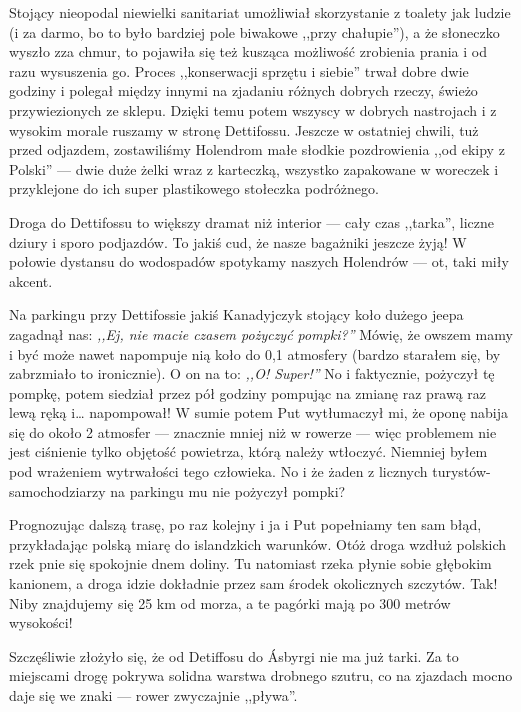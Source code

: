 Stojący nieopodal niewielki sanitariat umożliwiał skorzystanie z toalety jak ludzie (i za darmo, bo to było bardziej pole biwakowe ,,przy chałupie''), a że słoneczko wyszło zza chmur, to pojawiła się też kusząca możliwość zrobienia prania i od razu wysuszenia go. Proces ,,konserwacji sprzętu i siebie'' trwał dobre dwie godziny i polegał między innymi na zjadaniu różnych dobrych rzeczy, świeżo przywiezionych ze sklepu. Dzięki temu potem wszyscy w dobrych nastrojach i z wysokim morale ruszamy w stronę Dettifossu. Jeszcze w ostatniej chwili, tuż przed odjazdem, zostawiliśmy Holendrom małe słodkie pozdrowienia ,,od ekipy z Polski'' --- dwie duże żelki wraz z karteczką, wszystko zapakowane w woreczek i przyklejone do ich super plastikowego stołeczka podróżnego.

Droga do Dettifossu to większy dramat niż interior --- cały czas ,,tarka'', liczne dziury i sporo podjazdów. To jakiś cud, że nasze bagażniki jeszcze żyją! W połowie dystansu do wodospadów spotykamy naszych Holendrów --- ot, taki miły akcent.


Na parkingu przy Dettifossie jakiś Kanadyjczyk stojący koło dużego jeepa zagadnął nas: \emph{,,Ej, nie macie czasem pożyczyć pompki?''} Mówię, że owszem mamy i być może nawet napompuje nią koło do 0,1 atmosfery (bardzo starałem się, by zabrzmiało to ironicznie). O on na to: \emph{,,O! Super!''} No i faktycznie, pożyczył tę pompkę, potem siedział przez pół godziny pompując na zmianę raz prawą raz lewą ręką i… napompował! W sumie potem Put wytłumaczył mi, że oponę nabija się do około 2 atmosfer --- znacznie mniej niż w rowerze --- więc problemem nie jest ciśnienie tylko objętość powietrza, którą należy wtłoczyć. Niemniej byłem pod wrażeniem wytrwałości tego człowieka. No i że żaden z licznych turystów-samochodziarzy na parkingu mu nie pożyczył pompki?

Prognozując dalszą trasę, po raz kolejny i ja i Put popełniamy ten sam błąd, przykładając polską miarę do islandzkich warunków. Otóż droga wzdłuż polskich rzek pnie się spokojnie dnem doliny. Tu natomiast rzeka płynie sobie głębokim kanionem, a droga idzie dokładnie przez sam środek okolicznych szczytów. Tak! Niby znajdujemy się 25 km od morza, a te pagórki mają po 300 metrów wysokości!

Szczęśliwie złożyło się, że od Detiffosu do Ásbyrgi nie ma już tarki. Za to miejscami drogę pokrywa solidna warstwa drobnego szutru, co na zjazdach mocno daje się we znaki --- rower zwyczajnie ,,pływa''.

